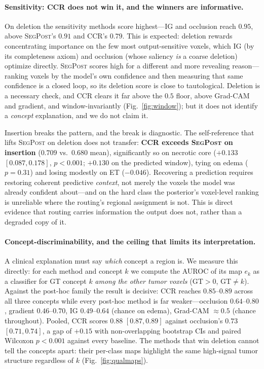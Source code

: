 \documentclass[runningheads]{llncs}
\begin{document}
\paragraph{Sensitivity: CCR does not win it, and the winners are informative.}
On deletion the sensitivity methods score highest---IG and occlusion reach $0.95$, above
\textsc{SegPost}'s $0.91$ and CCR's $0.79$. This is expected: deletion rewards concentrating
importance on the few most output-sensitive voxels, which IG (by its completeness axiom) and
occlusion (whose saliency \emph{is} a coarse deletion) optimize directly. \textsc{SegPost} scores
high for a different and more revealing reason---ranking voxels by the model's own confidence and
then measuring that same confidence is a closed loop, so its deletion score is close to
tautological. Deletion is a necessary check, and CCR clears it far above the $0.5$ floor,
above Grad-CAM and gradient, and window-invariantly (Fig.~\ref{fig:window}); but it does not
identify a \emph{concept} explanation, and we do not claim it.

Insertion breaks the pattern, and the break is diagnostic. The self-reference that lifts
\textsc{SegPost} on deletion does not transfer: \textbf{CCR exceeds \textsc{SegPost} on insertion}
($0.709$ vs.\ $0.680$ mean), significantly so on necrotic core ($+0.133$ $[0.087,0.178]$,
$p<0.001$; $+0.130$ on the predicted window), tying on edema ($p{=}0.31$) and losing modestly on
ET ($-0.046$). Recovering a prediction requires restoring coherent predictive \emph{context},
not merely the voxels the model was already confident about---and on the hard class the
posterior's voxel-level ranking is unreliable where the routing's regional assignment is not.
This is direct evidence that routing carries information the output does not, rather than a
degraded copy of it.

\paragraph{Concept-discriminability, and the ceiling that limits its interpretation.}
A clinical explanation must say \emph{which} concept a region is. We measure this directly: for
each method and concept $k$ we compute the AUROC of its map $e_k$ as a classifier for GT concept
$k$ \emph{among the other tumor voxels} (GT$>0$, GT$\neq k$). Against the post-hoc family the
result is decisive: CCR reaches $0.85$--$0.89$ across all three concepts while every post-hoc
method is far weaker---occlusion $0.64$--$0.80$, gradient $0.46$--$0.70$, IG $0.49$--$0.64$
(chance on edema), Grad-CAM $\approx\!0.5$ (chance throughout). Pooled, CCR scores $0.88$
$[0.87,0.89]$ against occlusion's $0.73$ $[0.71,0.74]$, a gap of $+0.15$ with non-overlapping
bootstrap CIs and paired Wilcoxon $p<0.001$ against every baseline. The methods that win deletion
cannot tell the concepts apart: their per-class maps highlight the same high-signal tumor
structure regardless of $k$ (Fig.~\ref{fig:qualmaps}).
\end{document}

